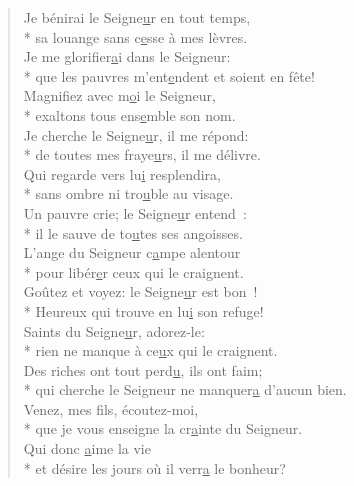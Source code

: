 
\begin{verse}
Je bénirai le Seigne\underline{u}r en tout temps, \\*
sa louange sans c\underline{e}sse à mes lèvres. \\
Je me glorifier\underline{a}i dans le Seigneur: \\*
que les pauvres m’ent\underline{e}ndent et soient en fête! \\

Magnifiez avec m\underline{o}i le Seigneur, \\*
exaltons tous ens\underline{e}mble son nom. \\
Je cherche le Seigne\underline{u}r, il me répond: \\*
de toutes mes fraye\underline{u}rs, il me délivre. \\

Qui regarde vers lu\underline{i} resplendira, \\*
sans ombre ni tro\underline{u}ble au visage. \\
Un pauvre crie; le Seigne\underline{u}r entend : \\*
il le sauve de to\underline{u}tes ses angoisses. \\

L’ange du Seigneur c\underline{a}mpe alentour \\*
pour libér\underline{e}r ceux qui le craignent. \\
Goûtez et voyez: le Seigne\underline{u}r est bon ! \\*
Heureux qui trouve en lu\underline{i} son refuge! \\

Saints du Seigne\underline{u}r, adorez-le: \\*
rien ne manque à ce\underline{u}x qui le craignent. \\
Des riches ont tout perd\underline{u}, ils ont faim; \\*
qui cherche le Seigneur ne manquer\underline{a} d’aucun bien. \\

Venez, mes f\underline{i}ls, écoutez-moi, \\*
que je vous enseigne la cr\underline{a}inte du Seigneur. \\
Qui donc \underline{a}ime la vie \\*
et désire les jours où il verr\underline{a} le bonheur? \\


\end{verse}
